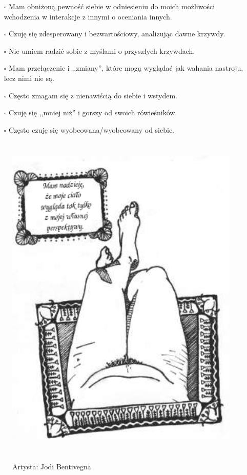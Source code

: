 \begin{multicols}{2}
\begin{itemize}
\item[$\square$]{Mam obniżoną pewność siebie w odniesieniu do moich możliwości wchodzenia w interakcje z innymi o oceniania innych.}
\item[$\square$]{Czuję się zdesperowany i bezwartościowy, analizując dawne krzywdy.}
\item[$\square$]{Nie umiem radzić sobie z myślami o przyszłych krzywdach.}
\item[$\square$]{Mam przełączenie i ,,zmiany'', które mogą wyglądać jak wahania nastroju, lecz nimi nie są.}
\item[$\square$]{Często zmagam się z nienawiścią do siebie i wstydem.}
\item[$\square$]{Czuję się ,,mniej niż'' i gorszy od swoich rówieśników.}
\item[$\square$]{Często czuję się wyobcowana/wyobcowany od siebie.}
\end{itemize}
\end{multicols}

\begin{figure}[h]
\centering
\includegraphics[height=16cm]{TeX_files/2-2-napis.png}
\label{2-2}
\begin{flushright}
Artysta: Jodi Bentivegna
\end{flushright}
\end{figure}

